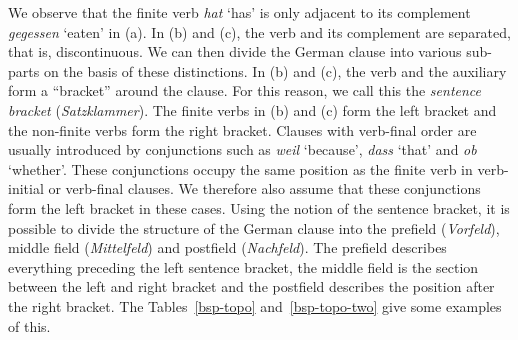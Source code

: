 We observe that the finite verb \emph{hat} `has' is only adjacent to its complement
\emph{gegessen} `eaten' in (a). In (b) and (c), the verb and its complement
are separated, that is, discontinuous. We can then divide the German clause into various sub-parts on the basis of these distinctions.
In (b) and (c), the verb and the auxiliary form a ``bracket'' around the clause. For this reason, we call this the \emph{sentence bracket} (\emph{Satzklammer}).
The finite verbs in (b) and (c) form the left bracket and the non-finite verbs form the right bracket. Clauses with verb-final order are usually introduced by conjunctions such as 
\emph{weil} `because', \emph{dass} `that' and \emph{ob} `whether'. These conjunctions occupy the same position as the finite verb in verb-initial or verb-final clauses. We therefore
also assume that these conjunctions form the left bracket in these cases. Using the notion of the sentence bracket, it is possible to divide the structure of the German clause into the 
prefield (\emph{Vorfeld}), middle field (\emph{Mittelfeld}) and postfield (\emph{Nachfeld}). The
prefield describes everything preceding the left sentence bracket, the middle field is the section
between the left and right bracket and the postfield describes the position after the right bracket.
The Tables~\ref{bsp-topo} and~\ref{bsp-topo-two} give some examples of this.
%
{}%
%
%
%
%
%
